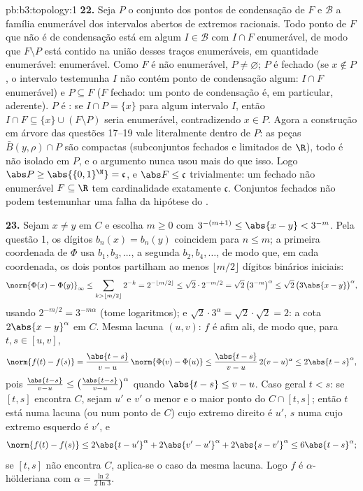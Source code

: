 \begin{solution}{pb:b3:topology:1}
\textbf{22.} Seja $P$ o conjunto dos pontos de condensação de $F$
e $\mathcal B$ a família enumerável dos intervalos abertos de
extremos racionais. Todo ponto de $F$ que não é de condensação está
em algum $I \in \mathcal B$ com $I \cap F$ enumerável, de modo que $F
\setminus P$ está contido na união desses traços enumeráveis, em
quantidade enumerável: enumerável. Como $F$ é não enumerável,
$P \neq \varnothing$; $P$ é fechado (se $x \notin P$, o
intervalo testemunha $I$ não contém ponto de condensação
algum: $I \cap F$ enumerável) e $P \subseteq F$ ($F$ fechado:
um ponto de condensação é, em particular, aderente). $P$ é
: se $I \cap P = \{x\}$ para algum intervalo $I$, então
$I \cap F \subseteq \{x\} \cup (F \setminus P)$ seria
enumerável, contradizendo $x \in P$. Agora a construção em árvore
das questões 17--19 vale literalmente dentro de $P$: as peças
$\bar B(y, \rho) \cap P$ são compactas (subconjuntos fechados e limitados
de $\R$), todo  é não isolado em $P$, e o
argumento nunca usou mais do que isso. Logo $\abs P \geq
\abs{\{0,1\}^\N} = \mathfrak c$, e $\abs F \leq \mathfrak
c$ trivialmente: um fechado não enumerável $F \subseteq \R$ tem
cardinalidade exatamente $\mathfrak c$. Conjuntos fechados não podem
testemunhar uma falha da hipótese do .

\textbf{23.} Sejam $x \neq y$ em $C$ e escolha $m \geq 0$ com
$3^{-(m+1)} \leq \abs{x - y} < 3^{-m}$. Pela questão 1, os
dígitos $b_n(x) = b_n(y)$ coincidem para $n \leq m$; a primeira
coordenada de $\Phi$ usa $b_1, b_3, \dots$, a segunda $b_2,
b_4, \dots$, de modo que, em cada coordenada, os dois pontos partilham ao
menos $\lfloor m/2\rfloor$ dígitos binários iniciais:
\[
\norm{\Phi(x) - \Phi(y)}_\infty
\leq \sum_{k > \lfloor m/2\rfloor}2^{-k}
= 2^{-\lfloor m/2\rfloor} \leq \sqrt2\cdot2^{-m/2}
= \sqrt2\,\bigl(3^{-m}\bigr)^\alpha
\leq \sqrt2\,\bigl(3\abs{x-y}\bigr)^\alpha,
\]
usando $2^{-m/2} = 3^{-m\alpha}$ (tome logaritmos); e
$\sqrt2\cdot3^\alpha = \sqrt2\cdot\sqrt2 = 2$: a cota
$2\abs{x-y}^\alpha$ em $C$. Mesma lacuna $(u, v)$: $f$ é afim
ali, de modo que, para $t, s \in [u, v]$,
\[
\norm{f(t) - f(s)} = \frac{\abs{t-s}}{v-u}\,
\norm{\Phi(v) - \Phi(u)}
\leq \frac{\abs{t-s}}{v-u}\,2(v-u)^\alpha
\leq 2\abs{t-s}^\alpha,
\]
pois $\frac{\abs{t-s}}{v-u} \leq \bigl(\frac{\abs{t-s}}
{v-u}\bigr)^\alpha$ quando $\abs{t-s} \leq v - u$. Caso geral $t <
s$: se $[t, s]$ encontra $C$, sejam $u'$ e $v'$ o menor
e o maior ponto do  $C \cap [t, s]$; então $t$
está numa lacuna (ou num ponto de $C$) cujo extremo direito é
$u'$, $s$ numa cujo extremo esquerdo é $v'$, e
\[
\norm{f(t) - f(s)} \leq 2\abs{t - u'}^\alpha
+ 2\abs{v' - u'}^\alpha + 2\abs{s - v'}^\alpha
\leq 6\abs{t - s}^\alpha ;
\]
se $[t, s]$ não encontra $C$, aplica-se o caso da mesma lacuna. Logo $f$ é
$\alpha$-hölderiana com $\alpha = \frac{\ln2}{2\ln3}$.


\end{solution}
